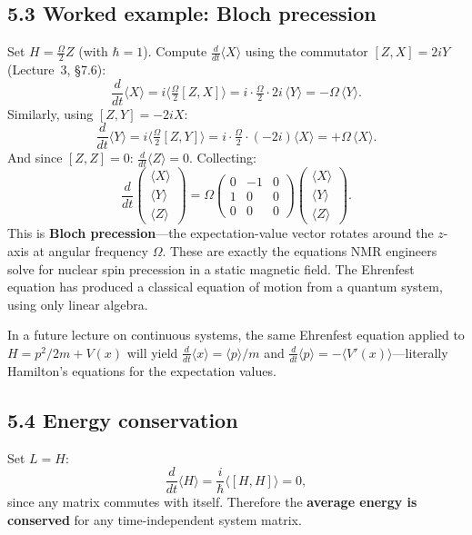 \documentclass[12pt,a4paper]{article}
\begin{document}
\subsection{5.3 Worked example: Bloch precession}
Set $H = \frac{\Omega}{2}Z$ (with $\hbar=1$).  Compute $\frac{d}{dt}\langle X\rangle$ using the commutator $[Z,X] = 2iY$ (Lecture~3, \S7.6):
\[
    \frac{d}{dt}\langle X\rangle = i\bigl\langle\tfrac{\Omega}{2}[Z,X]\bigr\rangle = i\cdot\tfrac{\Omega}{2}\cdot 2i\,\langle Y\rangle = -\Omega\,\langle Y\rangle.
\]
Similarly, using $[Z,Y] = -2iX$:
\[
    \frac{d}{dt}\langle Y\rangle = i\bigl\langle\tfrac{\Omega}{2}[Z,Y]\bigr\rangle = i\cdot\tfrac{\Omega}{2}\cdot(-2i)\langle X\rangle = +\Omega\,\langle X\rangle.
\]
And since $[Z,Z]=0$: $\frac{d}{dt}\langle Z\rangle = 0$.  Collecting:
\[
    \boxed{\frac{d}{dt}\begin{pmatrix}\langle X\rangle\\\langle Y\rangle\\\langle Z\rangle\end{pmatrix}
    = \Omega\begin{pmatrix}0&-1&0\\1&0&0\\0&0&0\end{pmatrix}
    \begin{pmatrix}\langle X\rangle\\\langle Y\rangle\\\langle Z\rangle\end{pmatrix}.}
\]
This is \textbf{Bloch precession}---the expectation-value vector rotates around the $z$-axis at angular frequency $\Omega$.  These are exactly the equations NMR engineers solve for nuclear spin precession in a static magnetic field.  The Ehrenfest equation has produced a classical equation of motion from a quantum system, using only linear algebra.

\medskip
\noindent In a future lecture on continuous systems, the same Ehrenfest equation applied to $H = p^2/2m + V(x)$ will yield $\frac{d}{dt}\langle x\rangle = \langle p\rangle/m$ and $\frac{d}{dt}\langle p\rangle = -\langle V'(x)\rangle$---literally Hamilton's equations for the expectation values.

\subsection{5.4 Energy conservation}
Set $L=H$:
\[
    \frac{d}{dt}\langle H \rangle = \frac{i}{\hbar}\langle [H,H] \rangle = 0,
\]
since any matrix commutes with itself.  Therefore the \textbf{average energy is conserved} for any time-independent system matrix.
\end{document}
